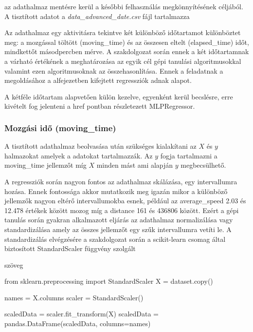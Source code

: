 az adathalmaz mentésre kerül a későbbi felhasználás megkönnyítésének céljából. A tisztított adatot a \textit{data\_advanced\_date.csv} fájl tartalmazza








Az adathalmaz egy aktivitásra tekintve két különböző időtartamot különböztet meg: a mozgással töltött (moving\_time) és az összesen eltelt (elapsed\_time) időt, mindkettőt másodpercben mérve. A szakdolgozat során ennek a két időtartamnak a várható értékének a meghatározása az egyik cél gépi tanulási algoritmusokkal valamint ezen algoritmusoknak az összehasonlítása. Ennek a feladatnak a megoldásához a   alfejezetben kifejtett regressziók adnak alapot.

A kétféle időtartam alapvetően külön kezelve, egyenként kerül becslésre, erre kivételt fog jelenteni a \TODO href pontban részletezett MLPRegressor.

\subsubsection{Mozgási idő (moving\_time)}
A tisztított adathalmaz beolvasása után szükséges kialakítani az $X$ és $y$ halmazokat amelyek a \TODO adatokat tartalmazzák. Az $y$ fogja tartalmazni a moving\_time jellemzőt míg $X$ minden mást ami alapján $y$ megbecsülhető. 

A regressziók során nagyon fontos az adathalmaz skálázása, egy intervallumra hozása. Ennek fontossága akkor mutatkozik meg igazán mikor a különböző jellemzők nagyon eltérő intervallumokba esnek, például az average\_speed 2.03 és 12.478 értékek között mozog míg a distance 161 és 436806 között. Ezért a gépi tanulás során gyakran alkalmazott eljárás az adathalmaz normalizálása vagy standardizálása amely az összes jellemzőt egy szűk intervallumra vetíti le. A standardizálás elvégzésére a szakdolgozat során a scikit-learn csomag által biztosított StandardScaler függvény szolgált

\begin{programreszlet}   
szöveg

\begin{python}
from sklearn.preprocessing import StandardScaler
X = dataset.copy()

names = X.columns
scaler = StandardScaler()

scaledData = scaler.fit_transform(X)
scaledData = pandas.DataFrame(scaledData, columns=names)
\end{python}
\end{programreszlet}

